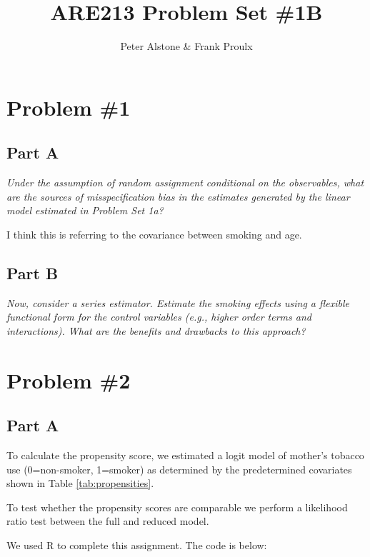 \documentclass[letterpaper, 12pt]{article}
\begin{document}
\title{ARE213 Problem Set \#1B}
\author{Peter Alstone \& Frank Proulx}
\maketitle

\section{Problem \#1}
\subsection{Part A}
\emph{Under the assumption of random assignment conditional on the observables, what are the sources of misspecification bias in the estimates generated by the linear model estimated in Problem Set 1a?}

I think this is referring to the covariance between smoking and age.




\subsection{Part B}
\emph{Now, consider a series estimator. Estimate the smoking effects using a flexible functional form for the control variables (e.g., higher order terms and interactions). What are the benefits and drawbacks to this approach?}


\section{Problem \#2}
\subsection{Part A}

To calculate the propensity score, we estimated a logit model of mother's tobacco use (0=non-smoker, 1=smoker) as determined by the predetermined covariates shown in Table \ref{tab:propensities}.



To test whether the propensity scores are comparable we perform a likelihood ratio test between the full and reduced model. 






We used R to complete this assignment.  The code is below:




\end{document}
